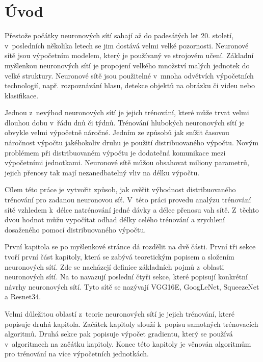 
\chapter{Úvod}
\label{chap:intro}

Přestože počátky neuronových sítí sahají až do padesátých let 20. století, v~posledních několika letech se jim dostává velmi velké pozornosti.
Neuronové sítě jsou výpočetním modelem, který je používaný ve strojovém učení.
Základní myšlenkou neuronových sítí je propojení velkého množství malých jednotek do velké struktury.
Neuronové sítě jsou použitelné v~mnoha odvětvích výpočetních technologií, např. rozpoznávání hlasu, detekce objektů na obrázku či videu nebo klasifikace.

Jednou z~nevýhod neuronových sítí je jejich trénování, které může trvat velmi dlouhou dobu v~řádu dnů či týdnů.
Trénování hlubokých neuronových sítí je obvykle velmi výpočetně náročné.
Jedním ze způsobů jak snížit časovou náročnost výpočtu jakéhokoliv druhu je použití distribuovaného výpočtu.
Novým problémem při distribuovaném výpočtu je dodatečná komunikace mezi výpočetními jednotkami.
Neuronové sítě můžou obsahovat miliony parametrů, jejich přenosy tak mají nezanedbatelný vliv na délku výpočtu.

Cílem této práce je vytvořit způsob, jak ověřit výhodnost distribuovaného trénování pro zadanou neuronovou síť.
V~této práci provedu analýzu trénování sítě vzhledem k~délce natrénování jedné dávky a délce přenosu vah sítě.
Z~těchto dvou hodnot můžu vypočítat odhad délky celého trénování a zrychlení dosaženého pomocí distribuovaného výpočtu.

První kapitola se po myšlenkové stránce dá rozdělit na dvě části.
První tři sekce tvoří první část kapitoly, která se zabývá teoretickým popisem a složením neuronových sítí.
Zde se nacházejí definice základních pojmů z~oblasti neuronových sítí.
Na to navazují poslední čtyři sekce, které popisují konkrétní návrhy neuronových sítí.
Tyto sítě se nazývají VGG16E, GoogLeNet, SqueezeNet a Resnet34.

Velmi důležitou oblastí z~teorie neuronových sítí je jejich trénování, které popisuje druhá kapitola.
Začátek kapitoly slouží k~popisu samotných trénovacích algoritmů.
Druhá sekce pak popisuje výpočet gradientu, který se používá v~algoritmech na začátku kapitoly.
Konec této kapitoly je věnován algoritmům pro trénování na více výpočetních jednotkách.

